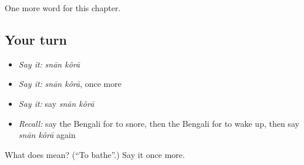 \begin{grammarlens}[title={What you've built}]
One more word for this chapter.
\end{grammarlens}

\subsection*{Your turn}
\begin{itemize}
\raggedright
  \item \emph{Say it:} \emph{snān kôrā}
  \item \emph{Say it:} \emph{snān kôrā}, once more
  \item \emph{Say it:} say \emph{snān kôrā}
  \item \emph{Recall:} say the Bengali for to snore, then the Bengali for to wake up, then say \emph{snān kôrā} again
\end{itemize}

\begin{tcolorbox}[breakable,colback=teal!4,colframe=teal!35!black,title={Before you move on}]
What does   mean? (\textquotedblleft{}To bathe\textquotedblright{}.) Say it once more.
\end{tcolorbox}

